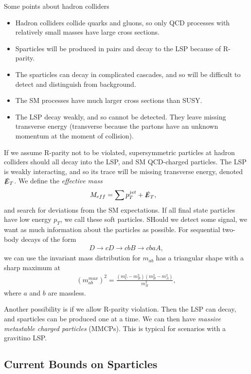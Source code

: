 \documentclass[twoside,english]{uiofysmaster}
\begin{document}
Some points about hadron colliders
\begin{itemize}
\item Hadron colliders collide quarks and gluons, so only QCD processes with relatively small masses have large cross sections.
\item Sparticles will be produced in pairs and decay to the LSP because of R-parity. 
\item The sparticles can decay in complicated cascades, and so will be difficult to detect and distinguish from background.
\item The SM processes have much larger cross sections than SUSY.
\item The LSP decay weakly, and so cannot be detected. They leave missing transverse energy (transverse because the partons have an unknown momentum at the moment of collision).
\end{itemize}
If we assume R-parity not to be violated, supersymmetric particles at hadron colliders should all decay into the LSP, and SM QCD-charged particles. The LSP is weakly interacting, and so its trace will be missing transverse energy, denoted $\slashed{E}_T$. We define the \textit{effective mass}
\begin{align}
M_{eff} &= \sum p_T^{jet} + \slashed{E}_T,
\end{align} 
and search for deviations from the SM expectations. If all final state particles have low energy $p_T$, we call these soft particles. SHould we detect some signal, we want as much information about the particles as possible. For sequential two-body decays of the form
\begin{align*}
D \rightarrow cD \rightarrow cbB \rightarrow cbaA,
\end{align*}
we can use the invariant mass distribution for $m_{ab}$ has a triangular shape with a sharp maximum at 
\begin{align}
(m_{ab}^{max})^2 = \frac{(m_C^2 - m_B^2)(m_B^2 - m_A^2)}{m_B^2},
\end{align}
where $a$ and $b$ are massless. 

Another possibility is if we allow R-parity violation. Then the LSP can decay, and sparticles can be produced one at a time. We can then have \textit{massive metastable charged particles} (MMCPs). This is typical for scenarios with a gravitino LSP. 

\subsection{Current Bounds on Sparticles}
\end{document}
